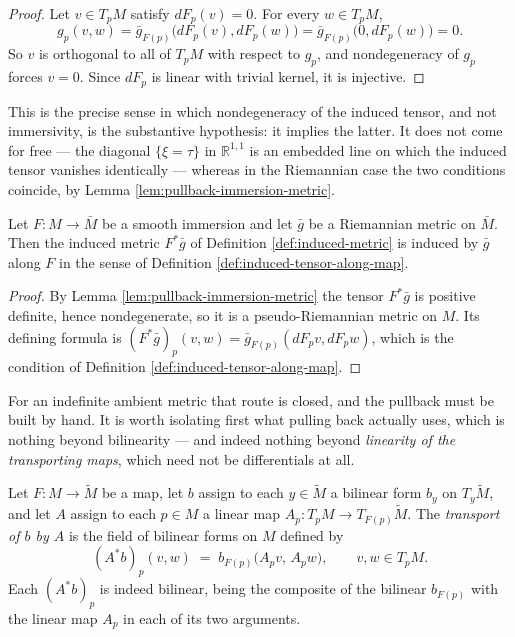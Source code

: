 \begin{proof}
\leanok
{}
Let $v \in T_pM$ satisfy $dF_p(v) = 0$. For every $w \in T_pM$,
\[
  g_p(v,w) = \bar{g}_{F(p)}\bigl(dF_p(v), dF_p(w)\bigr) = \bar{g}_{F(p)}\bigl(0, dF_p(w)\bigr) = 0 .
\]
So $v$ is orthogonal to all of $T_pM$ with respect to $g_p$, and nondegeneracy of $g_p$ forces $v = 0$. Since $dF_p$ is linear with trivial kernel, it is injective.
\end{proof}

This is the precise sense in which nondegeneracy of the induced tensor, and not immersivity, is the substantive hypothesis: it implies the latter. It does not come for free — the diagonal $\{\xi = \tau\}$ in $\mathbb{R}^{1,1}$ is an embedded line on which the induced tensor vanishes identically — whereas in the Riemannian case the two conditions coincide, by Lemma \ref{lem:pullback-immersion-metric}.

\begin{lemma}
\label{lem:riemannian-submanifold-induced-tensor}
\leanok
{}
Let $F : M \to \bar{M}$ be a smooth immersion and let $\bar{g}$ be a Riemannian metric on $\bar{M}$. Then the induced metric $F^*\bar{g}$ of Definition \ref{def:induced-metric} is induced by $\bar{g}$ along $F$ in the sense of Definition \ref{def:induced-tensor-along-map}.
\end{lemma}

\begin{proof}
\leanok
{}
By Lemma \ref{lem:pullback-immersion-metric} the tensor $F^*\bar{g}$ is positive definite, hence nondegenerate, so it is a pseudo-Riemannian metric on $M$. Its defining formula is $(F^*\bar{g})_p(v,w) = \bar{g}_{F(p)}(dF_p v, dF_p w)$, which is the condition of Definition \ref{def:induced-tensor-along-map}.
\end{proof}

For an indefinite ambient metric that route is closed, and the pullback must be built by hand. It is worth isolating first what pulling back actually uses, which is nothing beyond bilinearity --- and indeed nothing beyond \emph{linearity of the transporting maps}, which need not be differentials at all.

\begin{definition}
\label{def:bilinear-comp-of-family}
\leanok
Let $F : M \to \tilde{M}$ be a map, let $b$ assign to each $y \in \tilde{M}$ a bilinear form $b_y$ on $T_y\tilde{M}$, and let $A$ assign to each $p \in M$ a linear map $A_p : T_pM \to T_{F(p)}\tilde{M}$. The \emph{transport of $b$ by $A$} is the field of bilinear forms on $M$ defined by
\[
  (A^*b)_p(v,w) \;=\; b_{F(p)}\bigl(A_p v,\, A_p w\bigr), \qquad v,w \in T_pM .
\]
Each $(A^*b)_p$ is indeed bilinear, being the composite of the bilinear $b_{F(p)}$ with the linear map $A_p$ in each of its two arguments.
\end{definition}

